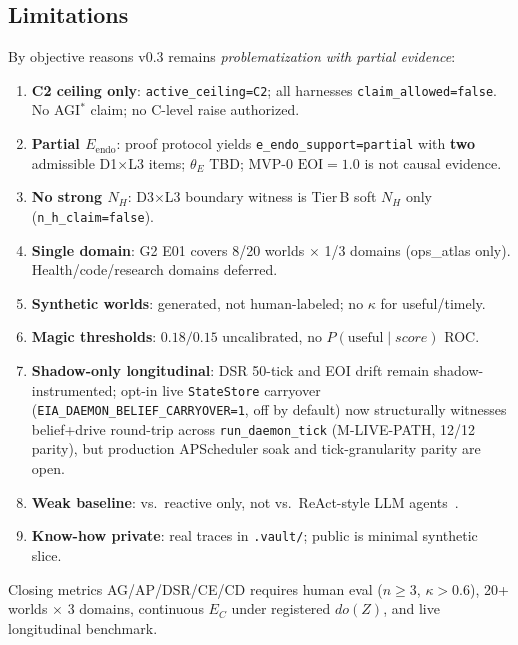 \documentclass[11pt,a4paper]{article}
\theoremstyle{definition}
\begin{document}
\subsection{Limitations}\label{sec:limitations}
By objective reasons v0.3 remains \emph{problematization with partial evidence}:
\begin{enumerate}[leftmargin=*]
\item \textbf{C2 ceiling only}: \texttt{active\_ceiling=C2}; all harnesses \texttt{claim\_allowed=false}. No AGI$^{*}$ claim; no C-level raise authorized.
\item \textbf{Partial $E_{\mathrm{endo}}$}: proof protocol yields \texttt{e\_endo\_support=partial} with \textbf{two} admissible D1$\times$L3 items; $\theta_E$ TBD; MVP-0 $\mathrm{EOI}{=}1.0$ is not causal evidence.
\item \textbf{No strong $N_H$}: D3$\times$L3 boundary witness is Tier\,B soft $N_H$ only (\texttt{n\_h\_claim=false}).
\item \textbf{Single domain}: G2 E01 covers 8/20 worlds $\times$ 1/3 domains (ops\_atlas only). Health/code/research domains deferred.
\item \textbf{Synthetic worlds}: generated, not human-labeled; no $\kappa$ for useful/timely.
\item \textbf{Magic thresholds}: $0.18/0.15$ uncalibrated, no $P(\mathrm{useful}\mid score)$ ROC.
\item \textbf{Shadow-only longitudinal}: DSR 50-tick and EOI drift remain shadow-instrumented; opt-in live \texttt{StateStore} carryover (\texttt{EIA\_DAEMON\_BELIEF\_CARRYOVER=1}, off by default) now structurally witnesses belief+drive round-trip across \texttt{run\_daemon\_tick} (M-LIVE-PATH, 12/12 parity), but production APScheduler soak and tick-granularity parity are open.
\item \textbf{Weak baseline}: vs.\ reactive only, not vs.\ ReAct-style LLM agents~\cite{sumers2024cala}.
\item \textbf{Know-how private}: real traces in \texttt{.vault/}; public is minimal synthetic slice.
\end{enumerate}
Closing metrics AG/AP/DSR/CE/CD requires human eval ($n{\ge}3$, $\kappa{>}0.6$), 20+ worlds $\times$ 3 domains, continuous $E_C$ under registered $do(Z)$, and live longitudinal benchmark.
\end{document}
